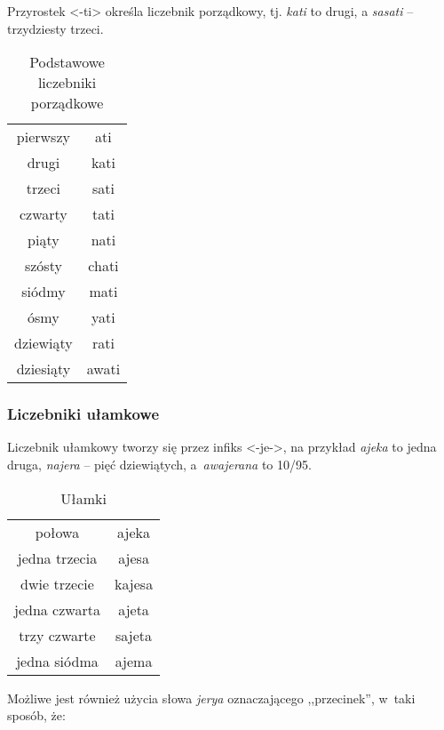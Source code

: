 \begin{spacing}{1.1}
Przyrostek <-ti> określa liczebnik porządkowy, tj. \emph{kati} to drugi, a
\emph{sasati} -- trzydziesty trzeci.

\begin{table}[ht]
\centering
\caption{Podstawowe liczebniki porządkowe}
\begin{tabular}{cc} \toprule
	pierwszy & ati \\
	drugi & kati \\
	trzeci & sati \\
	czwarty & tati \\
	piąty & nati \\
	szósty & chati \\
	siódmy & mati \\
	ósmy & yati \\
	dziewiąty & rati \\
	dziesiąty & awati \\\bottomrule
\end{tabular}
\label{tab:numerals3}
\end{table}

\subsubsection{Liczebniki ułamkowe}

Liczebnik ułamkowy tworzy się przez infiks <-je->, na przykład \emph{ajeka} to
jedna druga, \emph{najera} -- pięć dziewiątych, a~\emph{awajerana} to 10/95.

\begin{table}[ht]
	\centering
	\caption{Ułamki}
	\begin{tabular}{cc} \toprule
		połowa & ajeka \\
		jedna trzecia & ajesa \\
		dwie trzecie & kajesa \\
		jedna czwarta & ajeta \\
		trzy czwarte & sajeta \\
		jedna siódma & ajema  \\\bottomrule
	\end{tabular}
	\label{tab:numerals4}
\end{table}

Możliwe jest również użycia słowa \emph{jerya} oznaczającego ,,przecinek'',
w~taki sposób, że:



\end{spacing}
